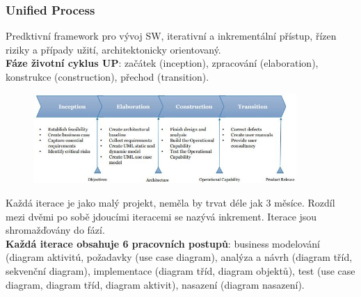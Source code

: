 \documentclass[11pt,a4paper]{article}
\begin{document}
    \subsubsection{Unified Process}
        Predktivní framework pro vývoj SW, iterativní a inkrementální přístup, řízen riziky a případy užití, architektonicky orientovaný.\\
        \textbf{Fáze životní cyklus UP}: začátek (inception), zpracování (elaboration), konstrukce (construction), přechod (transition).\\
        \begin{figure}
        \centering
        \includegraphics[width=10cm]{UP.jpg}
        \label{fig:UP}
        \end{figure}
        Každá iterace je jako malý projekt, neměla by trvat déle jak 3 měsíce. Rozdíl mezi dvěmi po sobě jdoucími iteracemi se nazývá inkrement. Iterace jsou shromažďovány do fází.\\
        \textbf{Každá iterace obsahuje 6 pracovních postupů}: business modelování (diagram aktivitú, požadavky (use case diagram), analýza a návrh (diagram tříd, sekvenční diagram), implementace (diagram tříd, diagram objektů), test (use case diagram, diagram tříd, diagram aktivit), nasazení (diagram nasazení).\\
\end{document}
